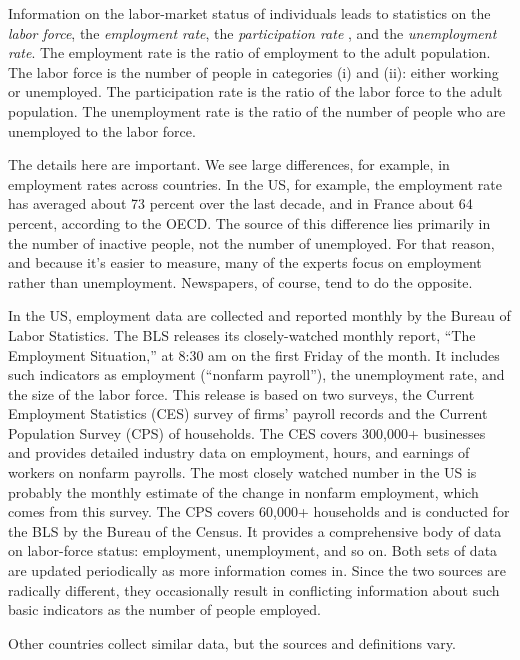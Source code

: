 Information on the labor-market status of individuals leads to
statistics on the {\it labor force\/}, 
the {\it employment rate\/},
the {\it participation rate \/}, 
and the {\it unemployment rate\/}. 
The employment rate is the ratio of employment to the adult population. 
The labor force is the number of people in categories (i) and
(ii): either working or unemployed.
The participation rate is the ratio of the labor force to the adult population. 
The unemployment rate is the ratio of the number of people who are unemployed to the labor force.

The details here are important.
We see large differences, for example, in employment rates across countries.
In the US, for example,
the employment rate has averaged about 73 percent over the last decade,
and in France about 64 percent, according to the OECD.
The source of this difference lies primarily in the number of inactive
people, not the number of unemployed.
For that reason, and because it's easier to measure,
many of the experts focus on employment rather than unemployment.
Newspapers, of course, tend to do the opposite.


In the US, employment data are collected and reported monthly by
the Bureau of Labor Statistics. The BLS releases its
closely-watched monthly report, ``The Employment Situation,'' at
8:30 am on the first Friday of the month.  It includes such
indicators as employment (``nonfarm payroll''),
the unemployment rate, and the size of the labor force.
This release is based on two surveys, the Current
Employment Statistics (CES) survey of firms' payroll records and
the Current Population Survey (CPS) of households. The CES covers
300,000+ businesses and provides detailed industry data on
employment, hours, and earnings of workers on nonfarm payrolls.
The most closely watched number in the US is probably the monthly
estimate of the change in nonfarm employment, which comes from this survey.
The CPS covers 60,000+ households and is conducted for the BLS by
the Bureau of the Census. It provides a comprehensive body of data
on labor-force status:  employment, unemployment, and so on.  Both
sets of data are updated periodically as more information comes
in.  Since the two sources are radically different,
they occasionally result in conflicting information about such
basic indicators as the number of people employed.

Other countries collect similar data, but the sources and definitions vary.

